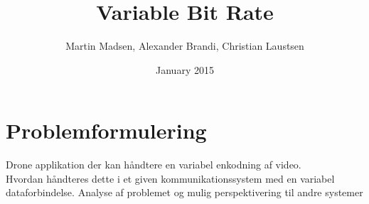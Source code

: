 \documentclass{article}
\title{Variable Bit Rate}
\author{Martin Madsen, Alexander Brandi, Christian Laustsen}
\date{January 2015}
\begin{document}
\maketitle

\section{Problemformulering}
Drone applikation der kan håndtere en variabel enkodning af video.\\

\noindent Hvordan håndteres dette i et given
kommunikationssystem med en variabel dataforbindelse.
Analyse af problemet og mulig perspektivering til andre systemer
\end{document}
